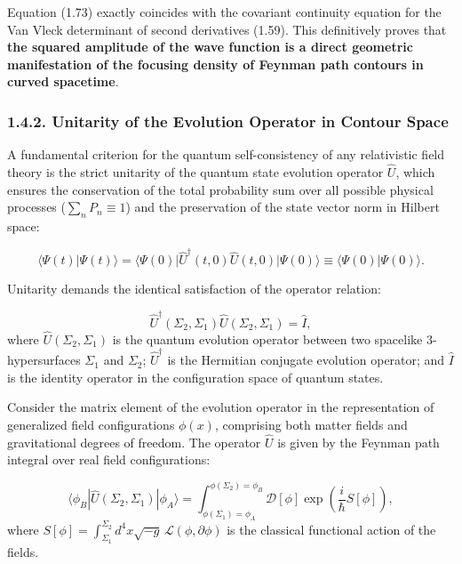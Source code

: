 \documentclass[11pt,a4paper]{article}
\theoremstyle{definition}
\begin{document}
Equation (1.73) exactly coincides with the covariant continuity equation for the Van Vleck determinant of second derivatives (1.59). This definitively proves that \textbf{the squared amplitude of the wave function is a direct geometric manifestation of the focusing density of Feynman path contours in curved spacetime}.

\subsubsection{1.4.2. Unitarity of the Evolution Operator in Contour Space}\label{sec:1.4.2}

A fundamental criterion for the quantum self-consistency of any relativistic field theory is the strict unitarity of the quantum state evolution operator $\hat{U}$, which ensures the conservation of the total probability sum over all possible physical processes ($\sum_n P_n \equiv 1$) and the preservation of the state vector norm in Hilbert space:

\begin{equation}\label{eq:1.74}\tag{1.74}
\langle \Psi(t) | \Psi(t) \rangle = \langle \Psi(0) | \hat{U}^\dagger(t, 0) \hat{U}(t, 0) | \Psi(0) \rangle \equiv \langle \Psi(0) | \Psi(0) \rangle.
\end{equation}

Unitarity demands the identical satisfaction of the operator relation:

\begin{equation}\label{eq:1.75}\tag{1.75}
\hat{U}^\dagger(\Sigma_2, \Sigma_1) \hat{U}(\Sigma_2, \Sigma_1) = \hat{I},
\end{equation}
where $\hat{U}(\Sigma_2, \Sigma_1)$ is the quantum evolution operator between two spacelike 3-hypersurfaces $\Sigma_1$ and $\Sigma_2$; $\hat{U}^\dagger$ is the Hermitian conjugate evolution operator; and $\hat{I}$ is the identity operator in the configuration space of quantum states.

Consider the matrix element of the evolution operator in the representation of generalized field configurations $\phi(x)$, comprising both matter fields and gravitational degrees of freedom. The operator $\hat{U}$ is given by the Feynman path integral over real field configurations:

\begin{equation}\label{eq:1.76}\tag{1.76}
\langle \phi_B | \hat{U}(\Sigma_2, \Sigma_1) | \phi_A \rangle = \int_{\phi(\Sigma_1)=\phi_A}^{\phi(\Sigma_2)=\phi_B} \mathcal{D}[\phi] \exp\left( \frac{i}{\hbar} S[\phi] \right),
\end{equation}
where $S[\phi] = \int_{\Sigma_1}^{\Sigma_2} d^4x \sqrt{-g} \, \mathcal{L}(\phi, \partial\phi)$ is the classical functional action of the fields.
\end{document}
